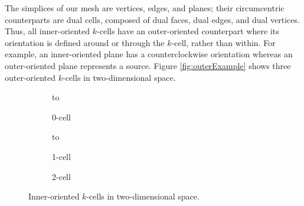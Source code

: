 The simplices of our mesh are vertices, edges, and planes; their circumcentric counterparts are dual cells, composed of dual faces, dual edges, and dual vertices. Thus, all inner-oriented $k$-cells have an outer-oriented counterpart where its orientation is defined around or through the $k$-cell, rather than within. For example, an inner-oriented plane has a counterclockwise orientation whereas an outer-oriented plane represents a source. Figure \ref{fig:outerExample} shows three outer-oriented $k$-cells in two-dimensional space.
\begin{figure}[ht]
    \newsavebox\boxInner
    \centering
    \begin{subfigure}[c]{0.3\textwidth}
        \centering
        \vbox to \ht{}
        \caption{0-cell}
        \label{fig:inner0Cell}
    \end{subfigure}
    \begin{subfigure}[c]{0.3\textwidth}
        \centering
        \vbox to \ht{}
        \caption{1-cell}
        \label{fig:inner1Cell}
    \end{subfigure}
    \begin{subfigure}[c]{0.3\textwidth}
        \centering
        \centering
        \usebox{\boxInner}
        \caption{2-cell}
        \label{fig:inner2Cell}
    \end{subfigure}
    \caption{Inner-oriented $k$-cells in two-dimensional space.}
    \label{fig:innerExample}
\end{figure}
